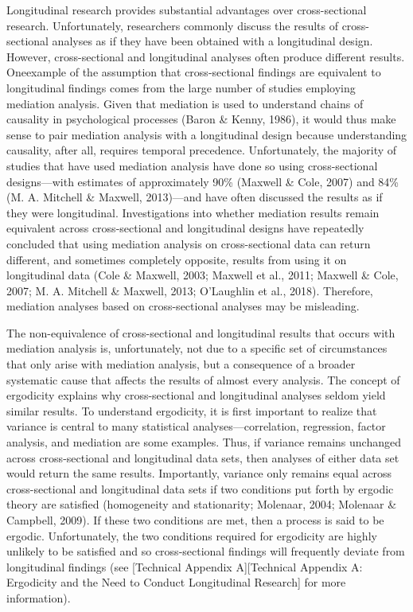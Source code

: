 \documentclass[
12pt, %
twoside,
english]{guelphthesis}
\theoremstyle{definition}
\theoremstyle{definition}
\theoremstyle{definition}
\theoremstyle{definition}
\theoremstyle{remark}
\begin{document}
Longitudinal research provides substantial advantages over cross-sectional research. Unfortunately, researchers commonly discuss the results of cross-sectional analyses as if they have been obtained with a longitudinal design. However, cross-sectional and longitudinal analyses often produce different results. Oneexample of the assumption that cross-sectional findings are equivalent to longitudinal findings comes from the large number of studies employing mediation analysis. Given that mediation is used to understand chains of causality in psychological processes (Baron \& Kenny, 1986), it would thus make sense to pair mediation analysis with a longitudinal design because understanding causality, after all, requires temporal precedence. Unfortunately, the majority of studies that have used mediation analysis have done so using cross-sectional designs---with estimates of approximately 90\% (Maxwell \& Cole, 2007) and 84\% (M. A. Mitchell \& Maxwell, 2013)---and have often discussed the results as if they were longitudinal. Investigations into whether mediation results remain equivalent across cross-sectional and longitudinal designs have repeatedly concluded that using mediation analysis on cross-sectional data can return different, and sometimes completely opposite, results from using it on longitudinal data (Cole \& Maxwell, 2003; Maxwell et al., 2011; Maxwell \& Cole, 2007; M. A. Mitchell \& Maxwell, 2013; O'Laughlin et al., 2018). Therefore, mediation analyses based on cross-sectional analyses may be misleading.

The non-equivalence of cross-sectional and longitudinal results that occurs with mediation analysis is, unfortunately, not due to a specific set of circumstances that only arise with mediation analysis, but a consequence of a broader systematic cause that affects the results of almost every analysis. The concept of ergodicity explains why cross-sectional and longitudinal analyses seldom yield similar results. To understand ergodicity, it is first important to realize that variance is central to many statistical analyses---correlation, regression, factor analysis, and mediation are some examples. Thus, if variance remains unchanged across cross-sectional and longitudinal data sets, then analyses of either data set would return the same results. Importantly, variance only remains equal across cross-sectional and longitudinal data sets if two conditions put forth by ergodic theory are satisfied (homogeneity and stationarity; Molenaar, 2004; Molenaar \& Campbell, 2009). If these two conditions are met, then a process is said to be ergodic. Unfortunately, the two conditions required for ergodicity are highly unlikely to be satisfied and so cross-sectional findings will frequently deviate from longitudinal findings (see {[}Technical Appendix A{]}{[}Technical Appendix A: Ergodicity and the Need to Conduct Longitudinal Research{]} for more information).
\end{document}
